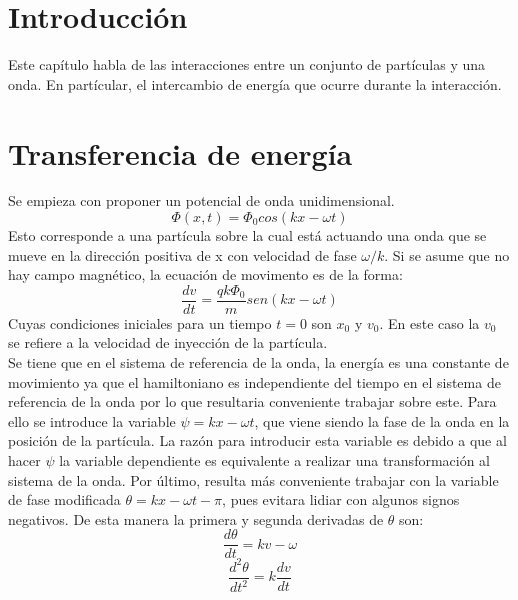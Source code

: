 \documentclass[../tesis_main_file.tex]{subfiles}
\begin{document}
\section{Introducción}
Este capítulo habla de las interacciones entre un conjunto de partículas y una onda. En partícular, el intercambio de energía que ocurre durante la interacción.
\section{Transferencia de energía}
Se empieza con proponer un potencial de onda unidimensional.
\begin{equation}
\label{eq:potencial_sinosoidal}
\Phi(x,t) = \Phi_0 cos(kx-\omega t)
\end{equation}
Esto corresponde a una partícula sobre la cual está actuando una onda que se mueve en la dirección positiva de x con velocidad de fase $\omega /k$. Si se asume que no hay campo magnético, la ecuación de movimento es de la forma:
\begin{equation}
\label{eq:mov_sen_particula}
\frac{dv}{dt}=\frac{qk\Phi_0}{m}sen(kx-\omega t)
\end{equation}
Cuyas condiciones iniciales para un tiempo $t=0$ son $x_0$ y $v_0$. En este caso la $v_0$ se refiere a la velocidad de inyección de la partícula.\\
Se tiene que en el sistema de referencia de la onda, la energía es una constante de movimiento ya que el hamiltoniano es independiente del tiempo en el sistema de referencia de la onda por lo que resultaria conveniente trabajar sobre este. Para ello se introduce la variable $\psi= kx - \omega t$, que viene siendo la fase de la onda en la posición de la partícula. La razón para introducir esta variable es debido a que al hacer $\psi$ la variable dependiente es equivalente a realizar una transformación al sistema de la onda. Por último, resulta más conveniente trabajar con la variable de fase modificada $\theta = kx -\omega t -\pi$, pues evitara lidiar con algunos signos negativos. De esta manera la primera y segunda derivadas de $\theta$ son:
\begin{equation}
\label{eq:deriv_theta}
\frac{d\theta}{dt}=kv -\omega
\end{equation}
\begin{equation}
\label{eq:segunda_deriv_theta}
\frac{d^2\theta}{dt^2}=k \frac{dv}{dt}
\end{equation}
\end{document}
